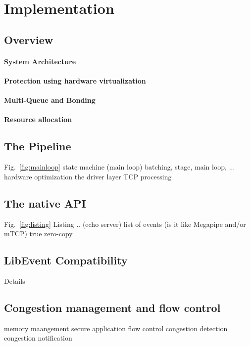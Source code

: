 
\section{Implementation}
\label{sec:impl}

\subsection{Overview}

\paragraph{System Architecture}



\paragraph{Protection using hardware virtualization}


\paragraph{Multi-Queue and Bonding}


%


\paragraph{Resource allocation}


\subsection{The \ix Pipeline}



\todo   Fig.~\ref{fig:mainloop} state machine (main loop)
\todo   batching, stage, main loop, ...
\todo   hardware optimization
\todo   the driver layer
\todo   TCP processing
     
\subsection{The \ix native API}


\todo Fig.~\ref{fig:listing} Listing .. (echo server)
\todo list of events (is it like Megapipe and/or mTCP)
\todo  true zero-copy

\subsection{LibEvent Compatibility}

\todo Details

\subsection{Congestion management and flow control}

\todo memory maangement
\todo secure application flow control
\todo congestion detection
\todo congestion notification



